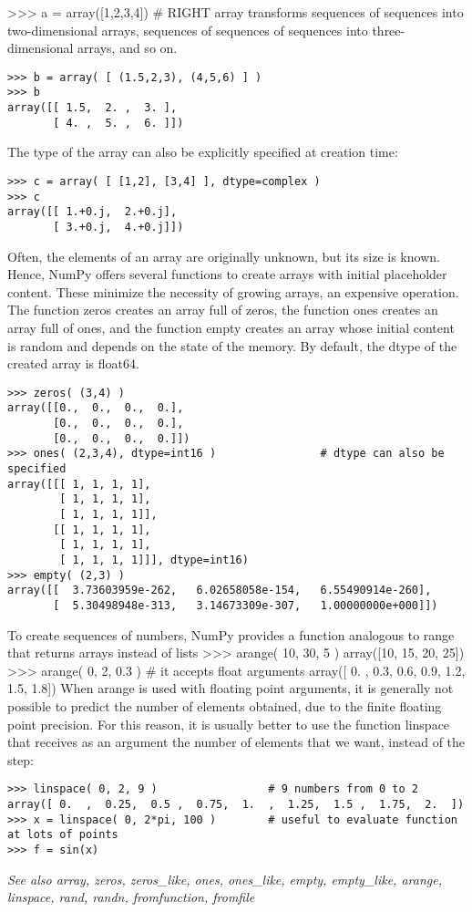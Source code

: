 >>> a = array([1,2,3,4])  # RIGHT
array transforms sequences of sequences into two-dimensional arrays, sequences of sequences of sequences into three-dimensional arrays, and so on.
\begin{verbatim}
>>> b = array( [ (1.5,2,3), (4,5,6) ] )
>>> b
array([[ 1.5,  2. ,  3. ],
       [ 4. ,  5. ,  6. ]])
\end{verbatim}
The type of the array can also be explicitly specified at creation time:
\begin{verbatim}
>>> c = array( [ [1,2], [3,4] ], dtype=complex )
>>> c
array([[ 1.+0.j,  2.+0.j],
       [ 3.+0.j,  4.+0.j]])
\end{verbatim}
Often, the elements of an array are originally unknown, but its size is known. Hence, NumPy offers several functions to create arrays with initial placeholder content. These minimize the necessity of growing arrays, an expensive operation.
The function zeros creates an array full of zeros, the function ones creates an array full of ones, and the function empty creates an array whose initial content is random and depends on the state of the memory. By default, the dtype of the created array is float64.
\begin{verbatim}
>>> zeros( (3,4) )
array([[0.,  0.,  0.,  0.],
       [0.,  0.,  0.,  0.],
       [0.,  0.,  0.,  0.]])
>>> ones( (2,3,4), dtype=int16 )                # dtype can also be specified
array([[[ 1, 1, 1, 1],
        [ 1, 1, 1, 1],
        [ 1, 1, 1, 1]],
       [[ 1, 1, 1, 1],
        [ 1, 1, 1, 1],
        [ 1, 1, 1, 1]]], dtype=int16)
>>> empty( (2,3) )
array([[  3.73603959e-262,   6.02658058e-154,   6.55490914e-260],
       [  5.30498948e-313,   3.14673309e-307,   1.00000000e+000]])
\end{verbatim}
To create sequences of numbers, NumPy provides a function analogous to range that returns arrays instead of lists
>>> arange( 10, 30, 5 )
array([10, 15, 20, 25])
>>> arange( 0, 2, 0.3 )                 # it accepts float arguments
array([ 0. ,  0.3,  0.6,  0.9,  1.2,  1.5,  1.8])
When arange is used with floating point arguments, it is generally not possible to predict the number of elements obtained, due to the finite floating point precision. For this reason, it is usually better to use the function linspace that receives as an argument the number of elements that we want, instead of the step:
\begin{verbatim}
>>> linspace( 0, 2, 9 )                 # 9 numbers from 0 to 2
array([ 0.  ,  0.25,  0.5 ,  0.75,  1.  ,  1.25,  1.5 ,  1.75,  2.  ])
>>> x = linspace( 0, 2*pi, 100 )        # useful to evaluate function at lots of points
>>> f = sin(x)
\end{verbatim}
\textit{See also
array, zeros, zeros_like, ones, ones_like, empty, empty_like, arange, linspace, rand, randn, fromfunction, fromfile}
\newpage
